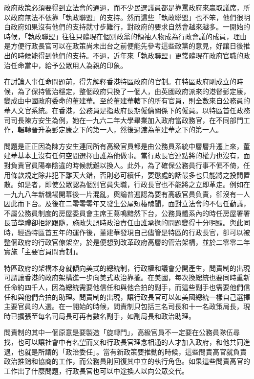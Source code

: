 政府政策必須要得到立法會的通過，而不少民選議員都是靠罵政府來贏取議席，所以政府無法不依靠「執政聯盟」的支持。然而這些「執政聯盟」也不笨，他們很明白政府如果沒有他們的支持就寸步難行，對政府的要求自然會越來越多。一開始的時候，「執政聯盟」往往只體現在個別政黨的領袖人物成為行政會議的成員，理由是方便行政長官可以在政策尚未出台之前便能先參考這些政黨的意見，好讓日後推出的時候能得到他們的支持。不過，近年來「執政聯盟」更常體現在政府官職的政治任命當中，給予公眾用人為親的印象。

在討論人事任命問題前，得先解釋香港特區政府的官制。在特區政府剛成立的時候，為了保持管治穩定，整個政府只換了一個人，由英國政府派來的港督彭定康，變成由中國政府委命的董建華。至於董建華轄下的所有官員，則全數來自公務員的華人文官系統。在香港，公務員是指政府長期僱傭關係下的僱員。以特區首任政務司司長陳方安生為例，她在一九六二年大學畢業加入政府當政務官，在不同部門工作，輾轉晉升為彭定康之下的第一人，然後過渡為董建華之下的第一人。

問題是正正因為陳方安生連同所有高級官員都是由公務員系統中層層升遷上來，董建華基本上沒有任何空間選擇由誰為他做事。當行政長官連點將的權力也沒有，面對負責官員陽奉陰違的時候就難以換人。此外，為了確保公務員行事不偏不倚，任用條款規定除非犯下離天大錯，否則必可續任，要懲處的話最多也只能將之投閒置散。如是者，即使公眾認為個別官員失職，行政長官也不能將之立即革走。例如在一九九八年新機場開幕後一片混亂，輿論普遍認為要有高級官員負責，卻沒有一人因此而下台。及後在二零零零年又發生公屋短樁醜聞，面對立法會的不信任動議，不屬公務員制度的房屋委員會主席王䓪鳴黯然下台，公務員體系內的時任房屋署署長苗學禮卻拒絕跟隨，施政失誤時政治責任由誰承擔的問題變得十分明顯。與此同時，經過特區首五年的運作後，董建華發現自己儘管是特區的行政長官，卻可以被整個政府的行政官僚架空，於是便想到改革政府高層的管治架構，並於二零零二年實施「主要官員問責制」。

特區政府的架構本身就傾向美式的總統制，行政權和議會分開產生，問責制的出現可謂讓香港的政府架構進一步向美式政治靠攏。在美國，每次換總統也要同時重新任命約四千人，因為總統需要他信任和與他合拍的副手，而這些副手也需要他們信任和與他們合拍的助理。問責制的出現，讓行政長官可以如美國總統一樣自己選擇主要官員的人選。在一開始的時候，問責制只包括三名司長和十一名政策局長，現時已擴張至每名司局長可再有數名副手，如副局長和政治助理。

問責制的其中一個原意是要製造「旋轉門」，高級官員不一定要在公務員隊伍尋找，也可以讓社會中有名望而又和行政長官理念相通的人才加入政府，和他共同進退，也就是所謂的「政治委任」。當有新政策要推動的時候，這些問責高官就負責政治推銷和協商的工作，而公務員則回復其中立的執行角色。如果這些問責高官的工作出了什麼問題，行政長官也可以中途換人以向公眾交代。


